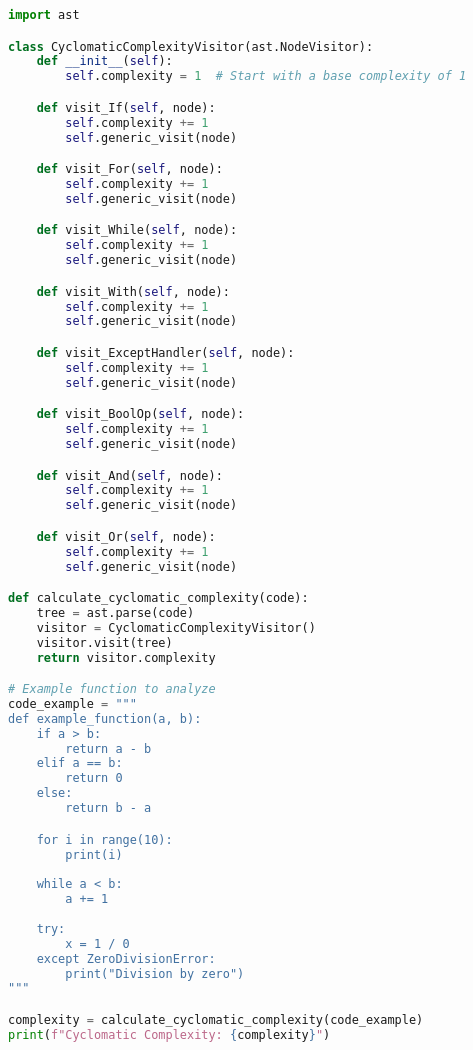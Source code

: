\documentclass[10pt,authoryear,onecolumn]{article}
\begin{document}
\begin{lstlisting}[language=Python, caption=Calculando la Complejidad Ciclomática en Python, basicstyle=\ttfamily\footnotesize, frame=single, breaklines=true, backgroundcolor=\color{lightgray}]
import ast

class CyclomaticComplexityVisitor(ast.NodeVisitor):
    def __init__(self):
        self.complexity = 1  # Start with a base complexity of 1

    def visit_If(self, node):
        self.complexity += 1
        self.generic_visit(node)

    def visit_For(self, node):
        self.complexity += 1
        self.generic_visit(node)

    def visit_While(self, node):
        self.complexity += 1
        self.generic_visit(node)

    def visit_With(self, node):
        self.complexity += 1
        self.generic_visit(node)

    def visit_ExceptHandler(self, node):
        self.complexity += 1
        self.generic_visit(node)

    def visit_BoolOp(self, node):
        self.complexity += 1
        self.generic_visit(node)

    def visit_And(self, node):
        self.complexity += 1
        self.generic_visit(node)

    def visit_Or(self, node):
        self.complexity += 1
        self.generic_visit(node)

def calculate_cyclomatic_complexity(code):
    tree = ast.parse(code)
    visitor = CyclomaticComplexityVisitor()
    visitor.visit(tree)
    return visitor.complexity

# Example function to analyze
code_example = """
def example_function(a, b):
    if a > b:
        return a - b
    elif a == b:
        return 0
    else:
        return b - a

    for i in range(10):
        print(i)
        
    while a < b:
        a += 1
        
    try:
        x = 1 / 0
    except ZeroDivisionError:
        print("Division by zero")
"""

complexity = calculate_cyclomatic_complexity(code_example)
print(f"Cyclomatic Complexity: {complexity}")
\end{lstlisting}
\end{document}
